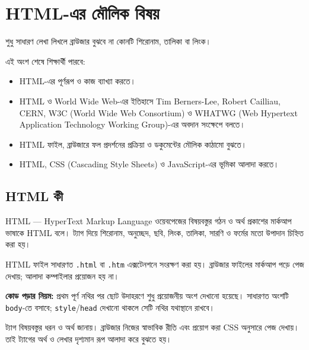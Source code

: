 \section{HTML-এর মৌলিক বিষয়}

শুধু সাধারণ লেখা লিখলে ব্রাউজার বুঝবে না কোনটি শিরোনাম, তালিকা বা লিংক।



\begin{learningbox}
এই অংশ শেষে শিক্ষার্থী পারবে:
\begin{itemize}
\item HTML-এর পূর্ণরূপ ও কাজ ব্যাখ্যা করতে।
\item HTML ও World Wide Web-এর ইতিহাসে Tim Berners-Lee, Robert Cailliau, CERN, W3C (World Wide Web Consortium) ও WHATWG (Web Hypertext Application Technology Working Group)-এর অবদান সংক্ষেপে বলতে।
\item HTML ফাইল, ব্রাউজারে ফল প্রদর্শনের প্রক্রিয়া ও ডকুমেন্টের মৌলিক কাঠামো বুঝতে।
\item HTML, CSS (Cascading Style Sheets) ও JavaScript-এর ভূমিকা আলাদা করতে।
\end{itemize}
\end{learningbox}

\subsection{HTML কী}
\begin{definitionbox}{HTML — HyperText Markup Language}
ওয়েবপেজের বিষয়বস্তুর গঠন ও অর্থ প্রকাশের মার্কআপ ভাষাকে HTML বলে। ট্যাগ দিয়ে শিরোনাম, অনুচ্ছেদ, ছবি, লিংক, তালিকা, সারণি ও ফর্মের মতো উপাদান চিহ্নিত করা হয়।
\end{definitionbox}
HTML ফাইল সাধারণত \texttt{.html} বা \texttt{.htm} এক্সটেনশনে সংরক্ষণ করা হয়। ব্রাউজার ফাইলের মার্কআপ পড়ে পেজ দেখায়; আলাদা কম্পাইলার প্রয়োজন হয় না।

\textbf{কোড পড়ার নিয়ম:} প্রথম পূর্ণ নথির পর ছোট উদাহরণে শুধু প্রয়োজনীয় অংশ দেখানো হয়েছে। সাধারণত অংশটি \texttt{body}-তে বসাবে; \texttt{style}/\texttt{head} দেখানো থাকলে সেটি নথির যথাস্থানে রাখবে।

ট্যাগ বিষয়বস্তুর ধরন ও অর্থ জানায়। ব্রাউজার নিজের স্বাভাবিক রীতি এবং প্রয়োগ করা CSS অনুসারে পেজ দেখায়। তাই ট্যাগের অর্থ ও লেখার দৃশ্যমান রূপ আলাদা করে বুঝতে হয়।


